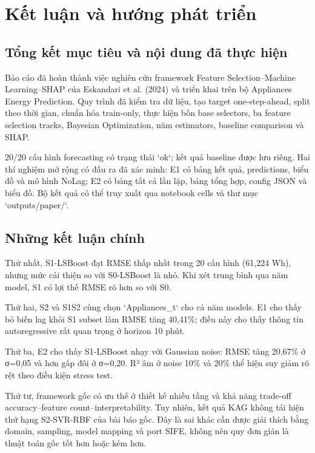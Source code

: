 \chapter{Kết luận và hướng phát triển}\label{chap:11}

\section{Tổng kết mục tiêu và nội dung đã thực hiện}\label{tux1ed5ng-kux1ebft-mux1ee5c-tiuxeau-vuxe0-nux1ed9i-dung-ux111uxe3-thux1ef1c-hiux1ec7n}

Báo cáo đã hoàn thành việc nghiên cứu framework Feature Selection--Machine Learning--SHAP của Eskandari et al. (2024) và triển khai trên bộ Appliances Energy Prediction. Quy trình đã kiểm tra dữ liệu, tạo target one-step-ahead, split theo thời gian, chuẩn hóa train-only, thực hiện bốn base selectors, ba feature selection tracks, Bayesian Optimization, năm estimators, baseline comparison và SHAP.

20/20 cấu hình forecasting có trạng thái `ok`; kết quả baseline được lưu riêng. Hai thí nghiệm mở rộng có đầu ra đã xác minh: E1 có bảng kết quả, predictions, biểu đồ và mô hình NoLag; E2 có bảng tất cả lần lặp, bảng tổng hợp, config JSON và biểu đồ. Bộ kết quả có thể truy xuất qua notebook cells và thư mục `outputs/paper/`.

\section{Những kết luận chính}\label{nhux1eefng-kux1ebft-luux1eadn-chuxednh}

Thứ nhất, S1-LSBoost đạt RMSE thấp nhất trong 20 cấu hình (61,224 Wh), nhưng mức cải thiện so với S0-LSBoost là nhỏ. Khi xét trung bình qua năm model, S1 có lợi thế RMSE rõ hơn so với S0.

Thứ hai, S2 và S1S2 cùng chọn `Appliances\_t` cho cả năm models. E1 cho thấy bỏ biến lag khỏi S1 subset làm RMSE tăng 40,41\%; điều này cho thấy thông tin autoregressive rất quan trọng ở horizon 10 phút.

Thứ ba, E2 cho thấy S1-LSBoost nhạy với Gaussian noise: RMSE tăng 20,67\% ở σ=0,05 và hơn gấp đôi ở σ=0,20. R² âm ở noise 10\% và 20\% thể hiện suy giảm rõ rệt theo điều kiện stress test.

Thứ tư, framework gốc có ưu thế ở thiết kế nhiều tầng và khả năng trade-off accuracy--feature count--interpretability. Tuy nhiên, kết quả KAG không tái hiện thứ hạng S2-SVR-RBF của bài báo gốc. Đây là sai khác cần được giải thích bằng domain, sampling, model mapping và port SIFE, không nên quy đơn giản là thuật toán gốc tốt hơn hoặc kém hơn.

